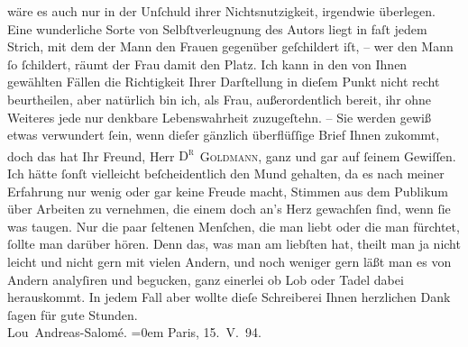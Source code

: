\begin{ledgroupsized}[t]{13cm}
                    wäre es auch nur in der Unſchuld ihrer Nichtsnutzigkeit, irgendwie überlegen.
                    Eine wunderliche Sorte von Selbſtverleugnung \introOben{}des Autors\introOben{}
                    liegt in faſt jedem Strich, mit dem der Mann den Frauen gegenüber geſchildert
                    iſt, {\pb}– wer den Mann ſo ſchildert,
                    räumt der Frau damit den Platz. Ich kann in den von Ihnen gewählten Fällen die
                    Richtigkeit Ihrer Darſtellung in dieſem Punkt nicht recht beurtheilen, aber
                    natürlich bin ich, als Frau, außerordentlich bereit, ihr ohne Weiteres jede nur
                    denkbare Lebenswahrheit zuzugeſtehn. –\pend
           \pstart
           Sie werden gewiß etwas verwundert ſein, wenn dieſer gänzlich überflüſſige Brief
                    Ihnen zukommt, doch das hat Ihr Freund, Herr \textsc{D\textsuperscript{r} }\textsc{Goldmann}, ganz und gar auf ſeinem Gewiſſen. Ich hätte ſonſt vielleicht
                    beſcheidentlich den Mund gehalten, da es nach meiner Erfahrung nur wenig oder
                    gar keine Freude macht, Stimmen aus dem Publikum über Arbeiten zu vernehmen, die
                    einem doch an's Herz gewachſen ſind, wenn ſie was taugen. Nur die paar ſeltenen
                    Menſchen, die man liebt oder die man fürchtet, ſollte man darüber hören. Denn
                    das, was man am liebſten hat, theilt man ja {\pb}nicht leicht und nicht gern mit
                    vielen Andern, und noch weniger gern läßt man es von Andern analyſiren und
                    begucken, ganz einerlei ob Lob oder Tadel dabei herauskommt.\pend
           \pstart
           In jedem Fall aber wollte dieſe Schreiberei Ihnen herzlichen Dank ſagen für
                    gute Stunden.{\\[\baselineskip]}\spacefill\mbox{Lou Andreas-Salomé.}\pend
           \leftskip=0em{}\pstart
           Paris, 15. V. 94.
                    \pend
           
         
         \endnumbering{}\end{ledgroupsized}  \newcommand{\dateiname}{L00325}\newcommand{\titel}{Lou Andreas-Salomé an Arthur Schnitzler, 15. 5. 1894}\newcommand{\editorInnen}{Martin Anton Müller und Gerd-Hermann Susen}
      